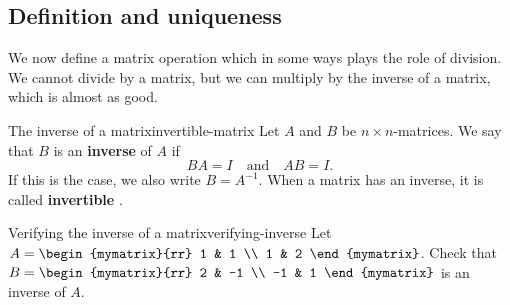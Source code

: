\subsection{Definition and uniqueness}

We now define a matrix operation which in some ways plays the role
of division. We cannot divide by a matrix, but we can multiply by the
inverse of a matrix, which is almost as good.

\begin{definition}{The inverse of a matrix}{invertible-matrix}
  Let $A$ and $B$ be $n\times n$-matrices. We say that $B$ is an
  \textbf{inverse}%
   of $A$ if
  \begin{equation*}
    BA=I\quad\mbox{and}\quad
    AB=I.
  \end{equation*}
  If this is the case, we also write $B=A^{-1}$. When a matrix has an
  inverse, it is called \textbf{invertible}%
  .
\end{definition}

\begin{example}{Verifying the inverse of a matrix}{verifying-inverse}
  Let $A=\begin{mymatrix}{rr}
    1 & 1 \\
    1 & 2
  \end{mymatrix}$. Check that $B=\begin{mymatrix}{rr}
    2 & -1 \\
    -1 & 1
  \end{mymatrix}$ is an inverse of $A$.
\end{example}

